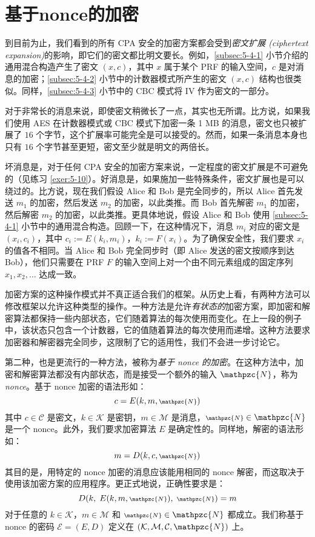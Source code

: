 \section{基于nonce的加密}\label{sec:5-5}

到目前为止，我们看到的所有 CPA 安全的加密方案都会受到\emph{密文扩展 (ciphertext expansion)}的影响，即它们的密文都比明文要长。例如，\ref{subsec:5-4-1} 小节介绍的通用混合构造产生了密文 $(x,c)$，其中 $x$ 属于某个 PRF 的输入空间，$c$ 是对消息的加密；\ref{subsec:5-4-2} 小节中的计数器模式所产生的密文 $(x,c)$ 结构也很类似。同样，\ref{subsec:5-4-3} 小节中的 CBC 模式将 IV 作为密文的一部分。

对于非常长的消息来说，即使密文稍微长了一点，其实也无所谓。比方说，如果我们使用 AES 在计数器模式或 CBC 模式下加密一条 1 MB 的消息，密文也只被扩展了 $16$ 个字节，这个扩展率可能完全是可以接受的。然而，如果一条消息本身也只有 $16$ 个字节甚至更短，密文至少就是明文的两倍长。

坏消息是，对于任何 CPA 安全的加密方案来说，一定程度的密文扩展是不可避免的（见练习 \ref{exer:5-10}）。好消息是，如果施加一些特殊条件，密文扩展也是可以绕过的。比方说，现在我们假设 Alice 和 Bob 是完全同步的，所以 Alice 首先发送 $m_1$ 的加密，然后发送 $m_2$ 的加密，以此类推。而 Bob 首先解密 $m_1$ 的加密，然后解密 $m_2$ 的加密，以此类推。更具体地说，假设 Alice 和 Bob 使用 \ref{subsec:5-4-1} 小节中的通用混合构造。回顾一下，在这种情况下，消息 $m_i$ 对应的密文是 $(x_i,c_i)$，其中 $c_i:=E(k_i,m_i)$，$k_i:=F(x_i)$。为了确保安全性，我们要求 $x_i$ 的值各不相同。当 Alice 和 Bob 完全同步时（即 Alice 发送的密文按顺序到达 Bob），他们只需要在 PRF $F$ 的输入空间上对一个由不同元素组成的固定序列 $x_1,x_2,\dots$ 达成一致。

加密方案的这种操作模式并不真正适合我们的框架。从历史上看，有两种方法可以修改框架以允许这种类型的操作。一种方法是允许\emph{有状态的}加密方案，即加密和解密算法都保持一些内部状态，它们随着算法的每次使用而变化。在上一段的例子中，该状态只包含一个计数器，它的值随着算法的每次使用而递增。这种方法要求加密器和解密器完全同步，这限制了它的适用性，我们不会进一步讨论它。

第二种，也是更流行的一种方法，被称为\emph{基于 nonce 的加密}。在这种方法中，加密和解密算法都没有内部状态，而是接受一个额外的输入 $\mathpzc{N}$，称为 \emph{nonce}。基于 nonce 加密的语法形如：
\[
c=E(k,m,{\scriptstyle\mathpzc{N}})
\]
其中 $c\in\mathcal{C}$ 是密文，$k\in\mathcal{K}$ 是密钥，$m\in\mathcal{M}$ 是消息，${\scriptstyle\mathpzc{N}}\in\mathpzc{N}$ 是一个 nonce。此外，我们要求加密算法 $E$ 是确定性的。同样地，解密的语法形如：
\[
m=D(k,c,{\scriptstyle\mathpzc{N}})
\]
其目的是，用特定的 nonce 加密的消息应该能用相同的 nonce 解密，而这取决于使用该加密方案的应用程序。更正式地说，正确性要求是：
\[
D(k,\;E(k,m,{\scriptstyle\mathpzc{N}}),\;{\scriptstyle\mathpzc{N}})=m
\]
对于任意的 $k\in\mathcal{K}$，$m\in\mathcal{M}$ 和 ${\scriptstyle\mathpzc{N}}\in\mathpzc{N}$ 都成立。我们称基于 nonce 的密码 $\mathcal{E}=(E,D)$ 定义在 $(\mathcal{K},\mathcal{M},\mathcal{C},\mathpzc{N})$ 上。

